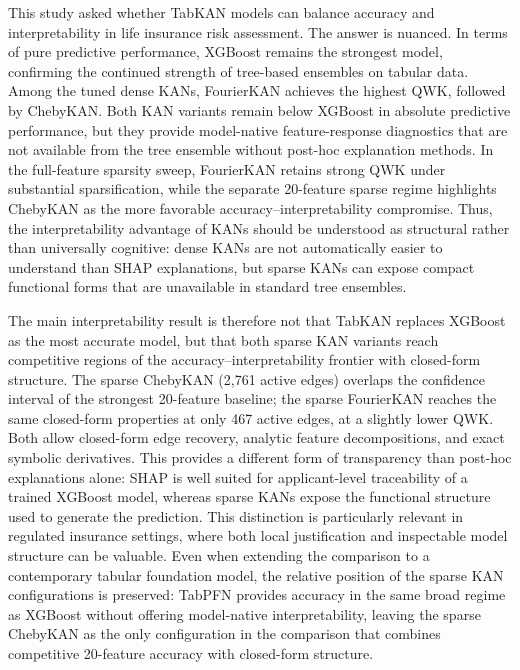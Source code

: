 \documentclass{article}
\begin{document}
This study asked whether TabKAN models can balance accuracy and interpretability in life insurance risk assessment. The answer is nuanced. In terms of pure predictive performance, XGBoost remains the strongest model, confirming the continued strength of tree-based ensembles on tabular data. Among the tuned dense KANs, FourierKAN achieves the highest QWK, followed by ChebyKAN. Both KAN variants remain below XGBoost in absolute predictive performance, but they provide model-native feature-response diagnostics that are not available from the tree ensemble without post-hoc explanation methods. In the full-feature sparsity sweep, FourierKAN retains strong QWK under substantial sparsification, while the separate 20-feature sparse regime highlights ChebyKAN as the more favorable accuracy--interpretability compromise. Thus, the interpretability advantage of KANs should be understood as structural rather than universally cognitive: dense KANs are not automatically easier to understand than SHAP explanations, but sparse KANs can expose compact functional forms that are unavailable in standard tree ensembles.

The main interpretability result is therefore not that TabKAN replaces XGBoost as the most accurate model, but that both sparse KAN variants reach competitive regions of the accuracy--interpretability frontier with closed-form structure. The sparse ChebyKAN (2{,}761 active edges) overlaps the confidence interval of the strongest 20-feature baseline; the sparse FourierKAN reaches the same closed-form properties at only 467 active edges, at a slightly lower QWK. Both allow closed-form edge recovery, analytic feature decompositions, and exact symbolic derivatives. This provides a different form of transparency than post-hoc explanations alone: SHAP is well suited for applicant-level traceability of a trained XGBoost model, whereas sparse KANs expose the functional structure used to generate the prediction. This distinction is particularly relevant in regulated insurance settings, where both local justification and inspectable model structure can be valuable. Even when extending the comparison to a contemporary tabular foundation model, the relative position of the sparse KAN configurations is preserved: TabPFN provides accuracy in the same broad regime as XGBoost without offering model-native interpretability, leaving the sparse ChebyKAN as the only configuration in the comparison that combines competitive 20-feature accuracy with closed-form structure.
\end{document}
